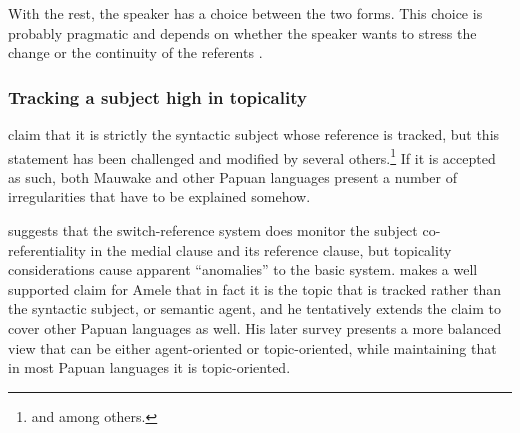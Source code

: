 





With the rest, the speaker has a choice between the two forms. This choice is probably pragmatic and depends on whether the speaker wants to stress the change or the continuity of the referents \citep[47]{Franklin1983}. 

\subsubsection{Tracking a subject high in topicality} 

\citet[xi]{HaimanEtAl1983} claim that it is strictly the syntactic subject whose reference is tracked, but this statement has been challenged and modified by several others.\footnote{\citet{Givon1983,Reesink1983a,Reesink1987,Roberts1988b,Roberts1997} and \citealt{Farr1999} among others.} If it is accepted as such, both Mauwake and other Papuan languages present a number of irregularities that have to be explained somehow.

\citet[242--243]{Reesink1983a} suggests that the switch-reference system does monitor the subject co-referentiality in the medial clause and its reference clause, but topicality considerations cause apparent ``anomalies'' to the basic system.  \citet{Roberts1988b} makes a well supported claim for Amele that in fact it is the topic that is tracked rather than the syntactic subject, or semantic agent, and he tentatively extends the claim to cover other Papuan languages as well. His later survey \citep{Roberts1997} presents a more balanced view that  can be either agent-oriented or topic-oriented, while maintaining that in most Papuan languages it is topic-oriented. 

